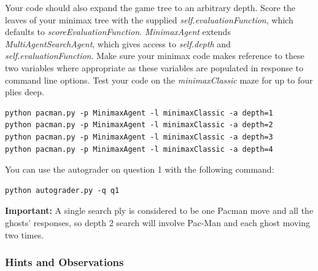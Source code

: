 \documentclass{article}
\begin{document}
Your code should also expand the game tree to an arbitrary depth. Score the leaves of your minimax tree with the supplied \emph{self.evaluationFunction}, which defaults to \emph{scoreEvaluationFunction}. \emph{MinimaxAgent} extends \emph{MultiAgentSearchAgent}, which gives access to \emph{self.depth} and \emph{self.evaluationFunction}. Make sure your minimax code makes reference to these two variables where appropriate as these variables are populated in response to command line options. Test your code on the \emph{minimaxClassic} maze for up to four plies deep. 

\begin{verbatim}
python pacman.py -p MinimaxAgent -l minimaxClassic -a depth=1
python pacman.py -p MinimaxAgent -l minimaxClassic -a depth=2
python pacman.py -p MinimaxAgent -l minimaxClassic -a depth=3
python pacman.py -p MinimaxAgent -l minimaxClassic -a depth=4
\end{verbatim}

You can use the autograder on question 1 with the following command:

\begin{verbatim}
python autograder.py -q q1
\end{verbatim}


\textbf{Important:} A single search ply is considered to be one Pacman move and all the ghosts' responses, so depth 2 search will involve Pac-Man and each ghost moving two times.


\subsubsection{Hints and Observations}
\end{document}
